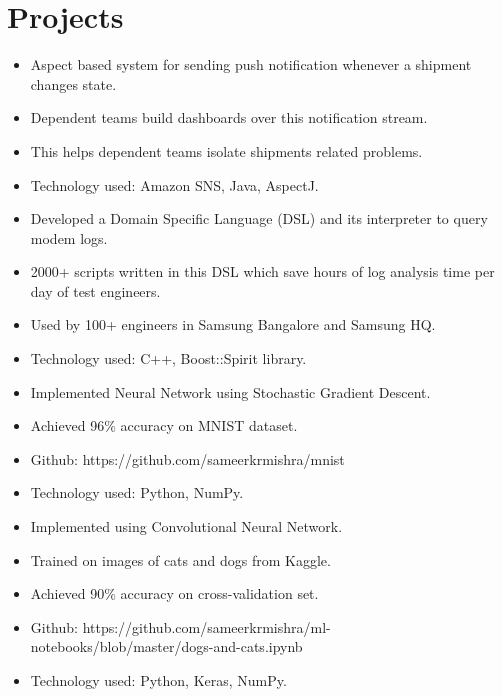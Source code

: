 \documentclass[a4paper,11pt]{simpleresume}
\begin{document}
\section{Projects}
\begin{itemize}
\item Aspect based system for sending push notification whenever a shipment changes state.
\item Dependent teams build dashboards over this notification stream.
\item This helps dependent teams isolate shipments related problems. 
\item Technology used: Amazon SNS, Java, AspectJ.
\end{itemize}
\begin{itemize}
    \item Developed a Domain Specific Language (DSL) and its interpreter to query modem logs.
    \item 2000+ scripts written in this DSL which save hours of log analysis time per day of test engineers.
    \item Used by 100+ engineers in Samsung Bangalore and Samsung HQ.
    \item Technology used: C++, Boost::Spirit library.
    \end{itemize}
\begin{itemize}
    \item Implemented Neural Network using Stochastic Gradient Descent.
    \item Achieved 96\% accuracy on MNIST dataset.
    \item Github: https://github.com/sameerkrmishra/mnist
    \item Technology used: Python, NumPy.
\end{itemize}
\begin{itemize}
    \item Implemented using Convolutional Neural Network.
    \item Trained on images of cats and dogs from Kaggle.
    \item Achieved 90\% accuracy on cross-validation set.
    \item Github: https://github.com/sameerkrmishra/ml- notebooks/blob/master/dogs-and-cats.ipynb
    \item Technology used: Python, Keras, NumPy.
\end{itemize}
\end{document}
